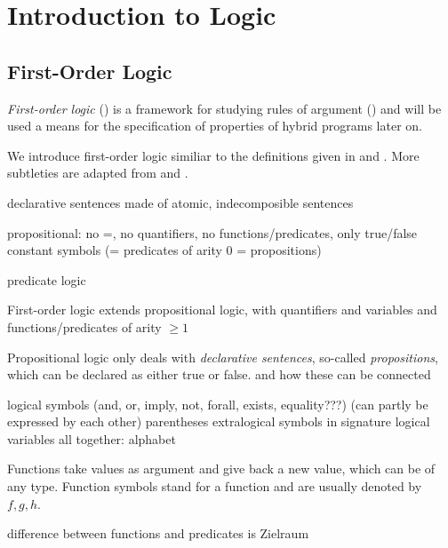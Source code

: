 \chapter{Introduction to Logic}
    \label{sec:introduction-logic}

    \section{First-Order Logic}
        \label{sec:first-order-logic}

        \textit{First-order logic} (\FOL) is a framework for studying rules of argument (\cite{Hodges2001ClassicalLogic}) and will be used a means for the specification of properties of hybrid programs later on.

        We introduce first-order logic similiar to the definitions given in \cite{Platzer10HybridSystems} and \cite{Huth04LogicInCS}. More subtleties are adapted from \cite{Hodges2001ClassicalLogic} and \cite{rautenberg10ConciseLogic}.

        declarative sentences made of atomic, indecomposible sentences


        propositional: no =, no quantifiers, no functions/predicates, only true/false constant symbols (= predicates of arity 0 = propositions)


        predicate logic

        First-order logic extends propositional logic,
        with quantifiers
        and variables
        and functions/predicates of arity $\geq 1$

        Propositional logic only deals with \textit{declarative sentences}, so-called \textit{propositions}, which can be declared as either true or false. and how these can be connected


        logical symbols (and, or, imply, not, forall, exists, equality???) (can partly be expressed by each other)
        parentheses
        extralogical symbols in signature
        logical variables
        all together: alphabet

        Functions take values as argument and give back a new value, which can be of any type. Function symbols stand for a function and are usually denoted by $f,g,h$.

        difference between functions and predicates is Zielraum

